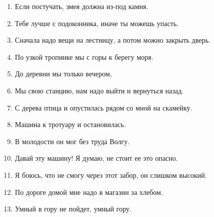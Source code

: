 \documentclass[paper=a4, fontsize=11pt]{scrartcl}
\begin{document}
\begin{enumerate}
    \item Если постучать, змея должна \raisebox{-0.1cm}{\shortstack{\underline{\hspace{3cm}}}}  из-под камня.
    \item Тебе лучше \raisebox{-0.1cm}{\shortstack{\underline{\hspace{3cm}}}}с подоконника, иначе ты можешь упасть. 
    \item Сначала надо \raisebox{-0.1cm}{\shortstack{\underline{\hspace{3cm}}} }вещи на лестницу, а потом можно закрыть дверь. 
    \item По узкой тропинке мы \raisebox{-0.1cm}{\shortstack{\underline{\hspace{3cm}}}} с горы к берегу моря. 
    \item До деревни мы  \raisebox{-0.1cm}{\shortstack{\underline{\hspace{3cm}}}}только вечером,
    \item Мы  \raisebox{-0.1cm}{\shortstack{\underline{\hspace{3cm}}}}  свою станцию, нам надо выйти и вернуться назад.
    \item  С дерева \raisebox{-0.1cm}{\shortstack{\underline{\hspace{3cm}}}}птица и опустилась рядом со мной на скамейку.
    \item  Машина\raisebox{-0.1cm}{\shortstack{\underline{\hspace{3cm}}}} к тротуару и остановилась.
    \item В молодости он мог без труда \raisebox{-0.1cm}{\shortstack{\underline{\hspace{3cm}}}} Волгу.
    \item Давай \raisebox{-0.1cm}{\shortstack{\underline{\hspace{3cm}}}}эту машину! Я думаю, не стоит ее \raisebox{-0.1cm}{\shortstack{\underline{\hspace{3cm}}}} это опасно.
    \item Я боюсь, что не смогу \raisebox{-0.1cm}{\shortstack{\underline{\hspace{3cm}}}} через этот забор, он слишком высокий.
    \item По дороге домой мне надо \raisebox{-0.1cm}{\shortstack{\underline{\hspace{3cm}}}} в магазин за хлебом.
    \item Умный в гору не пойдет, умный \raisebox{-0.1cm}{\shortstack{\underline{\hspace{3cm}}}} гору.

\end{enumerate}
\end{document}
